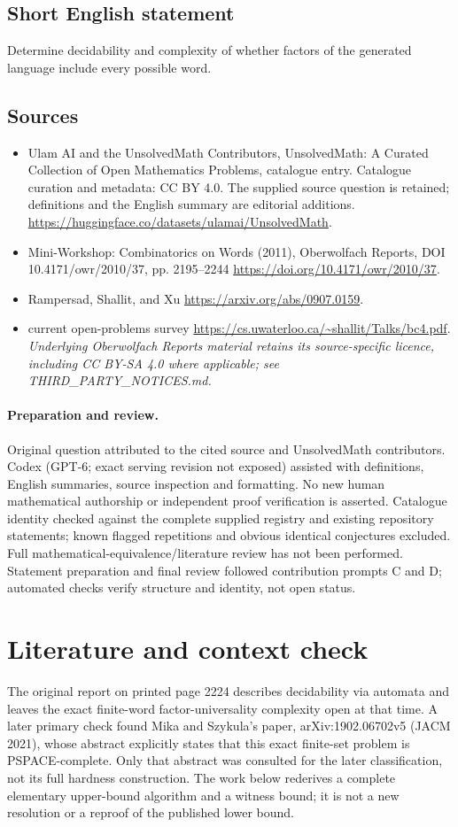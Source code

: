 \documentclass[11pt]{article}
\begin{document}
\subsection{Short English statement}
Determine decidability and complexity of whether factors of the generated language include every possible word.
\subsection{Sources}
\begin{itemize}
\item[S1] Ulam AI and the UnsolvedMath Contributors, UnsolvedMath: A Curated Collection of Open Mathematics Problems, catalogue entry. Catalogue curation and metadata: CC BY 4.0. The supplied source question is retained; definitions and the English summary are editorial additions.
\url{https://huggingface.co/datasets/ulamai/UnsolvedMath}.
\item[S2] Mini-Workshop: Combinatorics on Words (2011), Oberwolfach Reports, DOI 10.4171/owr/2010/37, pp. 2195--2244
\url{https://doi.org/10.4171/owr/2010/37}.
\item[S3] Rampersad, Shallit, and Xu
\url{https://arxiv.org/abs/0907.0159}.
\item[S4] current open-problems survey
\url{https://cs.uwaterloo.ca/~shallit/Talks/bc4.pdf}.
\textit{Underlying Oberwolfach Reports material retains its source-specific licence, including CC BY-SA 4.0 where applicable; see THIRD\_PARTY\_NOTICES.md.}
\end{itemize}
\paragraph{Preparation and review.}
Original question attributed to the cited source and UnsolvedMath contributors. Codex (GPT-6; exact serving revision not exposed) assisted with definitions, English summaries, source inspection and formatting. No new human mathematical authorship or independent proof verification is asserted. Catalogue identity checked against the complete supplied registry and existing repository statements; known flagged repetitions and obvious identical conjectures excluded. Full mathematical-equivalence/literature review has not been performed. Statement preparation and final review followed contribution prompts C and D; automated checks verify structure and identity, not open status.
\label{end:statement}

\section{Literature and context check}
The original report on printed page 2224 describes decidability via automata and leaves the exact finite-word factor-universality complexity open at that time. A later primary check found Mika and Szykula's paper, arXiv:1902.06702v5 (JACM 2021), whose abstract explicitly states that this exact finite-set problem is PSPACE-complete. Only that abstract was consulted for the later classification, not its full hardness construction. The work below rederives a complete elementary upper-bound algorithm and a witness bound; it is not a new resolution or a reproof of the published lower bound.
\end{document}
